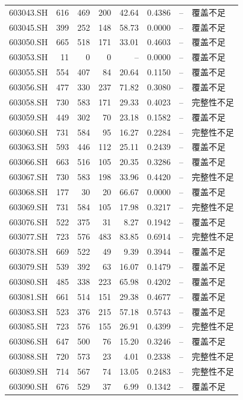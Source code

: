 \documentclass[10pt,a4paper]{article}
\begin{document}
\begin{longtable}{lrrr r r r l}
603043.SH & 616 & 469 & 200 & 42.64 & 0.4386 & -- & 覆盖不足\\
603045.SH & 399 & 252 & 148 & 58.73 & 0.0000 & -- & 覆盖不足\\
603050.SH & 665 & 518 & 171 & 33.01 & 0.4603 & -- & 覆盖不足\\
603053.SH & 11 & 0 & 0 & -- & 0.0000 & -- & 覆盖不足\\
603055.SH & 554 & 407 & 84 & 20.64 & 0.1150 & -- & 覆盖不足\\
603056.SH & 477 & 330 & 237 & 71.82 & 0.3080 & -- & 覆盖不足\\
603058.SH & 730 & 583 & 171 & 29.33 & 0.4023 & -- & 完整性不足\\
603059.SH & 449 & 302 & 70 & 23.18 & 0.1582 & -- & 覆盖不足\\
603060.SH & 731 & 584 & 95 & 16.27 & 0.2284 & -- & 完整性不足\\
603063.SH & 593 & 446 & 112 & 25.11 & 0.2439 & -- & 覆盖不足\\
603066.SH & 663 & 516 & 105 & 20.35 & 0.3286 & -- & 覆盖不足\\
603067.SH & 730 & 583 & 198 & 33.96 & 0.4420 & -- & 完整性不足\\
603068.SH & 177 & 30 & 20 & 66.67 & 0.0000 & -- & 覆盖不足\\
603069.SH & 731 & 584 & 105 & 17.98 & 0.3217 & -- & 完整性不足\\
603076.SH & 522 & 375 & 31 & 8.27 & 0.1942 & -- & 覆盖不足\\
603077.SH & 723 & 576 & 483 & 83.85 & 0.6914 & -- & 完整性不足\\
603078.SH & 669 & 522 & 49 & 9.39 & 0.3944 & -- & 覆盖不足\\
603079.SH & 539 & 392 & 63 & 16.07 & 0.1479 & -- & 覆盖不足\\
603080.SH & 485 & 338 & 223 & 65.98 & 0.4202 & -- & 覆盖不足\\
603081.SH & 661 & 514 & 151 & 29.38 & 0.4677 & -- & 覆盖不足\\
603083.SH & 523 & 376 & 215 & 57.18 & 0.5743 & -- & 覆盖不足\\
603085.SH & 723 & 576 & 155 & 26.91 & 0.4399 & -- & 完整性不足\\
603086.SH & 647 & 500 & 76 & 15.20 & 0.3246 & -- & 覆盖不足\\
603088.SH & 720 & 573 & 23 & 4.01 & 0.2338 & -- & 完整性不足\\
603089.SH & 714 & 567 & 74 & 13.05 & 0.2483 & -- & 完整性不足\\
603090.SH & 676 & 529 & 37 & 6.99 & 0.1342 & -- & 覆盖不足\\

\end{longtable}
\end{document}
